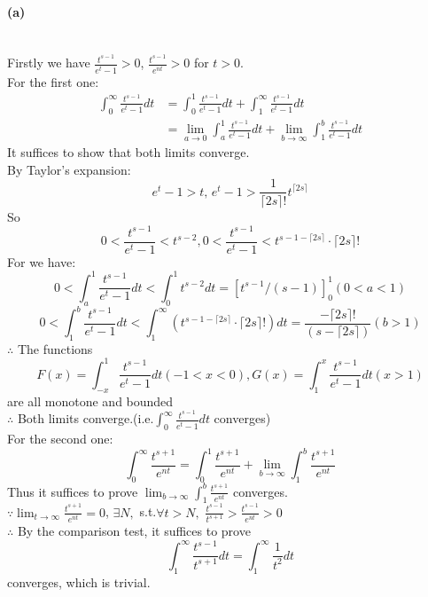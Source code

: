 \documentclass{article}
\def\to{\rightarrow}
\begin{document}
\paragraph{(a)}\ \\
Firstly we have $\frac{t^{s-1}}{e^t-1}>0$, $\frac{t^{s-1}}{e^{nt}}>0$ for $t>0$.\\
For the first one:
\begin{align*}
    \int_{0}^{\infty}\frac{t^{s-1}}{e^t-1}dt&=\int_{0}^{1}\frac{t^{s-1}}{e^t-1}dt+
    \int_{1}^{\infty}\frac{t^{s-1}}{e^t-1}dt\\
    &=\lim_{a\to0} \int_{a}^{1}\frac{t^{s-1}}{e^t-1}dt+
    \lim_{b\to\infty}\int_{1}^{b}\frac{t^{s-1}}{e^t-1}dt
\end{align*}
It suffices to show that both limits converge.\\
By Taylor's expansion:
$$e^t-1>t ,\, e^t-1>\frac{1}{\lceil 2s\rceil!}t^{\lceil 2s\rceil}$$
So 
$$0<\frac{t^{s-1}}{e^t-1}<t^{s-2} , 0<\frac{t^{s-1}}{e^t-1}<{t^{s-1-\lceil 2s\rceil}}\cdot{\lceil 2s\rceil!}$$
For we have:
$$0<\int_{a}^{1}\frac{t^{s-1}}{e^t-1}dt<\int_{0}^{1}
t^{s-2}dt=\left[t^{s-1}/(s-1)\right]^{1}_0(0<a<1)$$
$$0<\int_{1}^{b}\frac{t^{s-1}}{e^t-1}dt<\int_{1}^{\infty}\left({t^{s-1-\lceil 2s\rceil}}\cdot{\lceil 2s\rceil!}\right)dt=\frac{{-\lceil 2s\rceil!}}{(s-\lceil 2s\rceil)}(b>1)$$
$\therefore$ The functions
$$F(x)=\int_{-x}^{1}\frac{t^{s-1}}{e^t-1}dt(-1<x<0),G(x)=\int_{1}^{x}\frac{t^{s-1}}{e^t-1}dt(x>1)$$
are all monotone and bounded\\
$\therefore$ Both limits converge.(i.e.$\int_{0}^{\infty}\frac{t^{s-1}}{e^t-1}dt$ converges)\\
For the second one:\\
$$\int_{0}^{\infty}\frac{t^{s+1}}{e^{nt}}=\int_{0}^{1}\frac{t^{s+1}}{e^{nt}}
+\lim_{b\to\infty}\int_{1}^{b}\frac{t^{s+1}}{e^{nt}}$$
Thus it suffices to prove
$\lim_{b\to\infty}\int_{1}^{b}\frac{t^{s+1}}{e^{nt}}$ converges.\\
$\because \lim_{t\to\infty}\frac{t^{s+1}}{e^{nt}}=0$, $\exists N,$ s.t.$\forall t>N,$
$\frac{t^{s-1}}{t^{s+1}}>\frac{t^{s-1}}{e^{nt}}>0$\\
$\therefore$ By the comparison test, it suffices to prove
$$\int_{1}^{\infty}\frac{t^{s-1}}{t^{s+1}}dt=\int_{1}^{\infty}\frac{1}{t^2}dt$$
converges, which is trivial.
\end{document}
